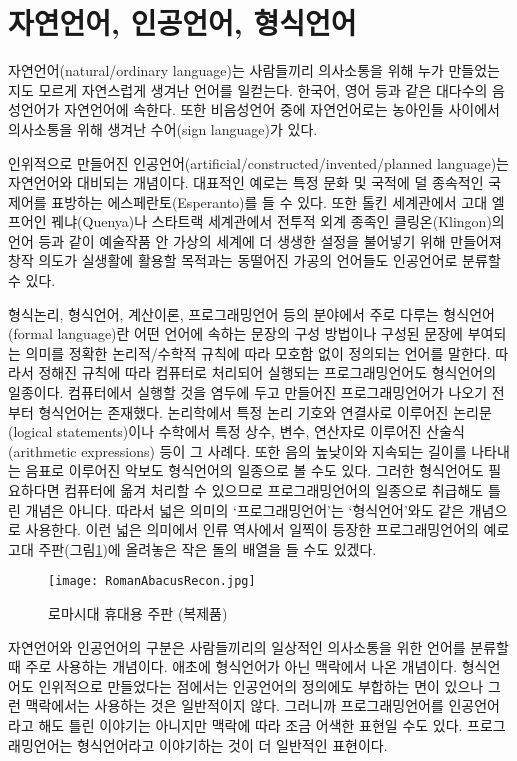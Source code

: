 \section{자연언어, 인공언어, 형식언어}

자연언어(natural/ordinary language)는 사람들끼리 의사소통을 위해 누가 만들었는지도 모르게
자연스럽게 생겨난 언어를 일컫는다. 한국어, 영어 등과 같은 대다수의 음성언어가
자연언어에 속한다. 또한 비음성언어 중에 자연언어로는 농아인들 사이에서 의사소통을
위해 생겨난 수어(sign language)가 있다.

인위적으로 만들어진 인공언어(artificial/constructed/invented/planned language)는
자연언어와 대비되는 개념이다. 대표적인 예로는 특정 문화 및 국적에 덜 종속적인
국제어를 표방하는 에스페란토(Esperanto)를 들 수 있다. 또한 톨킨 세계관에서
고대 엘프어인 꿰냐(Quenya)나 스타트랙 세계관에서 전투적 외계 종족인 클링온(Klingon)의
언어 등과 같이 예술작품 안 가상의 세계에 더 생생한 설정을 불어넣기 위해 만들어져
창작 의도가 실생활에 활용할 목적과는 동떨어진 가공의 언어들도 인공언어로 분류할 수 있다.

형식논리, 형식언어, 계산이론, 프로그래밍언어 등의 분야에서 주로 다루는
형식언어(formal language)란 어떤 언어에 속하는 문장의 구성 방법이나
구성된 문장에 부여되는 의미를 정확한 논리적/수학적 규칙에 따라 모호함 없이
정의되는 언어를 말한다. 따라서 정해진 규칙에 따라 컴퓨터로 처리되어 실행되는
프로그래밍언어도 형식언어의 일종이다. 컴퓨터에서 실행할 것을 염두에 두고
만들어진 프로그래밍언어가 나오기 전부터 형식언어는 존재했다.
논리학에서 특정 논리 기호와 연결사로 이루어진 논리문(logical statements)이나
수학에서 특정 상수, 변수, 연산자로 이루어진 산술식(arithmetic expressions)
등이 그 사례다. 또한 음의 높낮이와 지속되는 길이를 나타내는 음표로 이루어진
악보도 형식언어의 일종으로 볼 수도 있다. 그러한 형식언어도 필요하다면
컴퓨터에 옮겨 처리할 수 있으므로 프로그래밍언어의 일종으로 취급해도
틀린 개념은 아니다. 따라서 넓은 의미의 `프로그래밍언어'는 `형식언어'와도
같은 개념으로 사용한다. 이런 넓은 의미에서 인류 역사에서 일찍이 등장한
프로그래밍언어의 예로 고대 주판(그림\;\ref{fig:RomanAbacus})에 올려놓은
작은 돌의 배열을 들 수도 있겠다.

\begin{figure}[b]\center
\texttt{[image: RomanAbacusRecon.jpg]}
\caption{로마시대 휴대용 주판 (복제품)\label{fig:RomanAbacus}\\
          }
\end{figure}

자연언어와 인공언어의 구분은 사람들끼리의 일상적인 의사소통을 위한 언어를
분류할 때 주로 사용하는 개념이다. 애초에 형식언어가 아닌 맥락에서 나온 개념이다.
형식언어도 인위적으로 만들었다는 점에서는 인공언어의 정의에도 부합하는 면이 있으나
그런 맥락에서는 사용하는 것은 일반적이지 않다. 그러니까 프로그래밍언어를
인공언어라고 해도 틀린 이야기는 아니지만 맥락에 따라 조금 어색한 표현일 수도 있다.
프로그래밍언어는 형식언어라고 이야기하는 것이 더 일반적인 표현이다.

